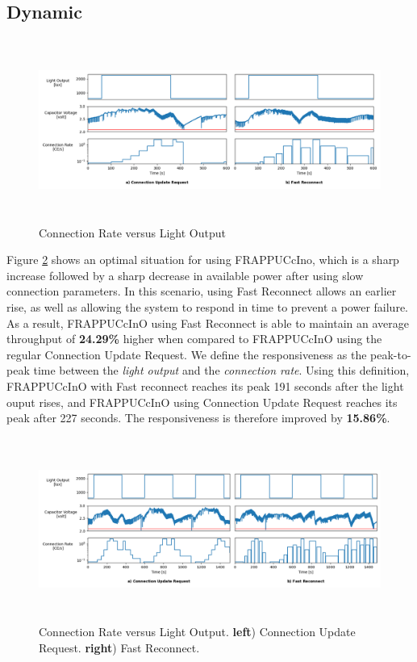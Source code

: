 \subsection{Dynamic}
\label{sec:dynamic_evaluation}
\begin{figure}[]
    \centering
    \includegraphics[width=1\textwidth,height=6cm,keepaspectratio=true]{plots/dynamic_short_both.png}
    \caption{
        Connection Rate versus Light Output
    }
    \label{fig:dynamic_short_both}
\end{figure}

Figure \ref{fig:dynamic_long_both} shows an optimal situation for using FRAPPUCcIno, which is a sharp increase followed by a sharp decrease in available power after using slow connection parameters. In this scenario, using Fast Reconnect allows an earlier rise, as well as allowing the system to respond in time to prevent a power failure. As a result, FRAPPUCcInO using Fast Reconnect is able to maintain an average throughput of \textbf{24.29\%} higher when compared to FRAPPUCcInO using the regular Connection Update Request. We define the responsiveness as the peak-to-peak time between the \textit{light output} and the \textit{connection rate}. Using this definition, FRAPPUCcInO with Fast reconnect reaches its peak 191 seconds after the light ouput rises, and FRAPPUCcInO using Connection Update Request reaches its peak after 227 seconds. The responsiveness is therefore improved by \textbf{15.86\%}.


\begin{figure}[]
    \centering
    \includegraphics[width=1\textwidth,height=6cm,keepaspectratio=true]{plots/dynamic_long_both.png}
    \caption{
        Connection Rate versus Light Output. \textbf{left}) Connection Update Request. \textbf{right}) Fast Reconnect.
    }
    \label{fig:dynamic_long_both}
\end{figure}

